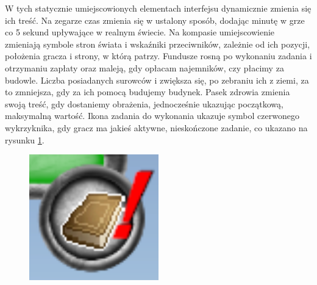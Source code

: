 W tych statycznie umiejscowionych elementach interfejsu dynamicznie zmienia się ich treść. Na zegarze czas zmienia się w ustalony sposób,
dodając minutę w grze co 5 sekund upływające w realnym świecie. Na kompasie umiejscowienie zmieniają symbole stron świata i wskaźniki przeciwników,
zależnie od ich pozycji, położenia gracza i strony, w którą patrzy. Fundusze rosną po wykonaniu zadania i otrzymaniu zapłaty oraz maleją, gdy opłacam
najemników, czy płacimy za budowle. Liczba posiadanych surowców i zwiększa się, po zebraniu ich z ziemi, za to zmniejsza, gdy za ich pomocą budujemy budynek.  
Pasek zdrowia zmienia swoją treść, gdy dostaniemy obrażenia, jednocześnie ukazując początkową, maksymalną wartość. Ikona zadania do wykonania ukazuje symbol 
czerwonego wykrzyknika, gdy gracz ma jakieś aktywne, nieskończone zadanie, co ukazano na rysunku \ref{fig:wyq}.
\begin{figure}[htbp]
    \centering
    \includegraphics[width=0.5\textwidth]{images/ui/wykrzyknik_quest.png}
    \caption{
    }\label{fig:wyq}
\end{figure}

